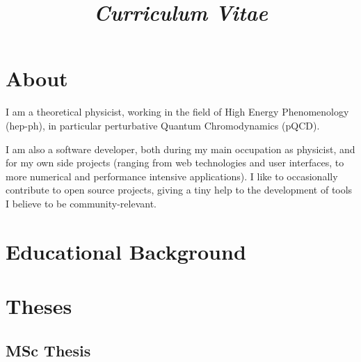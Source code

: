 \documentclass[10pt, a4paper, sans]{moderncv}
\title{\emph{Curriculum Vitae}}
\begin{document}
\makecvtitle

\section{About}

I am a theoretical physicist, working in the field of High Energy Phenomenology (hep-ph), in particular perturbative Quantum Chromodynamics (pQCD).

I am also a software developer, both during my main occupation as physicist, and for my own side projects (ranging from web technologies and user interfaces, to more numerical and performance intensive applications).
I like to occasionally contribute to open source projects, giving a tiny help to the development of tools I believe to be community-relevant.

\section{Educational Background}

\bigskip


\bigskip


\bigskip


\bigskip


\bigskip

\section{Theses}

\medskip

\subsection{\textbf{MSc Thesis}}
\end{document}
